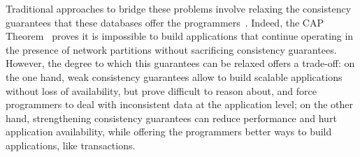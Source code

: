 

Traditional approaches to bridge these problems involve relaxing the consistency guarantees that these databases offer the programmers~\citep{vogels-eventual}. Indeed, the CAP Theorem~\citep{cap-brewer, cap-theorem} proves it is impossible to build applications that continue operating in the presence of network partitions without sacrificing consistency guarantees. However, the degree to which this guarantees can be relaxed offers a trade-off: on the one hand, weak consistency guarantees allow to build scalable applications without loss of availability, but prove difficult to reason about, and force programmers to deal with inconsistent data at the application level; on the other hand, strengthening consistency guarantees can reduce performance and hurt application availability, while offering the programmers better ways to build applications, like transactions.
